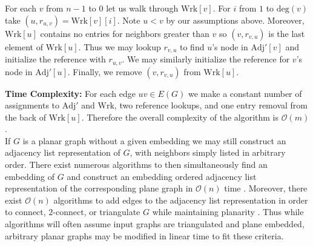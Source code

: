 \documentclass[letterpaper, 12pt]{amsart}
\theoremstyle{definition}
\theoremstyle{definition}
\theoremstyle{thm}
\theoremstyle{definition}
\begin{document}
For each $v$ from $n-1$ to $0$ let us walk through $\text{Wrk}[v]$. For $i$ from
$1$ to $\text{deg}(v)$ take $(u,r_{u,v})=\text{Wrk}[v][i]$. Note $u<v$ by our
assumptions above. Moreover, $\text{Wrk}[u]$ contains no entries for neighbors
greater than $v$ so $(v,r_{v,u})$ is the last element of $\text{Wrk}[u]$. Thus
we may lookup $r_{v,u}$ to find $u$'s node in $\text{Adj}'[v]$ and initialize the
reference with $r_{u,v}$. We may similarly initialize the reference for $v$'s
node in $\text{Adj}'[u]$. Finally, we remove $(v,r_{v,u})$ from $\text{Wrk}[u]$.

\noindent\textbf{Time Complexity:} For each edge $uv\in E(G)$ we make a constant
number of assignments to $\text{Adj}'$ and $\text{Wrk}$, two reference
lookups, and one entry removal from the back of $\text{Wrk}[u]$.
Therefore the overall complexity of the algorithm is $\mathcal{O}(m)$.\\

If $G$ is a planar graph without a given embedding we may still construct an
adjacency list representation of $G$, with neighbors simply listed in arbitrary
order. There exist numerous algorithms to then simultaneously find an embedding
of $G$ and construct an embedding ordered adjacency list representation of the
corresponding plane graph in $\mathcal{O}(n)$ time \cite{tarjan, lempel, boyer,
booth}. Moreover, there exist $\mathcal{O}(n)$ algorithms to add edges
to the adjacency list representation in order to connect, $2$-connect, or
triangulate $G$ while maintaining planarity \cite{hagerup,reed,eswaran}. Thus
while algorithms will often assume input graphs are triangulated and plane
embedded, arbitrary planar graphs may be modified in linear time to fit these
criteria.

\begin{comment}
If $G$ is a $2$-connected weakly triangulated graph with an outer cycle
$C=v_1v_2\ldots v_k$, vertices listed in clockwise order. We shall set the
the neighbor range of $v_i$ such that the start and indices are the indices of
$v_{i-1}$ and $v_{i+1}$ in $A[v_i]$, respectively. These indices are consider
in a cyclic manner, that is we consider $v_{0}=v_k$, $v_1=v_{k+1}$, and so on.
Many of the algorithms considered will work by removing one vertex at a time,
and considering the remaining graph using the maximal $2$-connected
subgraphs. If $v$ on the outer face, we may remove $v$ from $G$ by contracting
the neighbor ranges for its neighboring vertices on the outer face exclude $v$.
Interior neighbors will be If one of the
neighbors of $v$ is a cutvertex once $G$ is removed, we will split into two
\end{comment}
\end{document}
